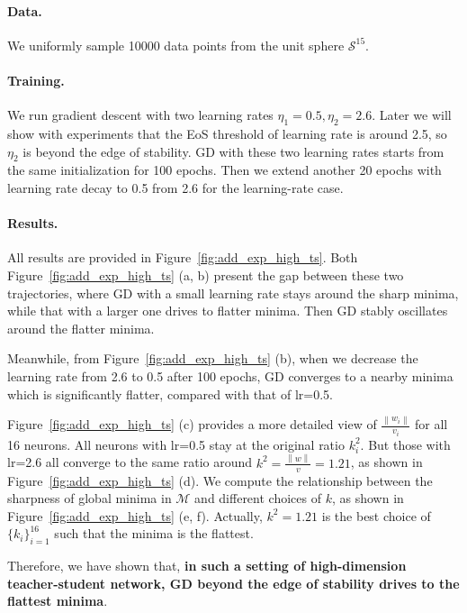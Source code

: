 \documentclass{article}
\theoremstyle{plain}
\theoremstyle{remark}
\newcommand{\norm}[1]{\left\lVert#1\right\rVert}
\begin{document}
\paragraph{Data.} We uniformly sample 10000 data points from the unit sphere $\mathcal{S}^{15}$.

\paragraph{Training.} We run gradient descent with two learning rates $\eta_1 = 0.5, \eta_2=2.6$. Later we will show with experiments that the EoS threshold of learning rate is around 2.5, so $\eta_2$ is beyond the edge of stability. GD with these two learning rates starts from the same initialization for 100 epochs. Then we extend another 20 epochs with learning rate decay to 0.5 from 2.6 for the learning-rate case.

\paragraph{Results.} All results are provided in Figure~\ref{fig:add_exp_high_ts}. Both Figure~\ref{fig:add_exp_high_ts} (a, b) present the gap between these two trajectories, where GD with a small learning rate stays around the sharp minima, while that with a larger one drives to flatter minima. Then GD stably oscillates around the flatter minima.

Meanwhile, from Figure~\ref{fig:add_exp_high_ts} (b), when we decrease the learning rate from 2.6 to 0.5 after 100 epochs, GD converges to a nearby minima which is significantly flatter, compared with that of lr=0.5.

Figure~\ref{fig:add_exp_high_ts} (c) provides a more detailed view of $\frac{\norm{w_i}}{v_i}$ for all 16 neurons. All neurons with lr=0.5 stay at the original ratio $k_i^2$. But those with lr=2.6 all converge to the same ratio around $k^2=\frac{\norm{w}}{v}=1.21$, as shown in Figure~\ref{fig:add_exp_high_ts} (d). We compute the relationship between the sharpness of global minima in $\mathcal{M}$ and different choices of $k$, as shown in Figure~\ref{fig:add_exp_high_ts} (e, f).
Actually, $k^2=1.21$ is the best choice of $\{k_i\}_{i=1}^{16}$ such that the minima is the flattest.

Therefore, we have shown that, \textbf{in such a setting of high-dimension teacher-student network, GD beyond the edge of stability drives to the flattest minima}.

\newpage 
\end{document}

